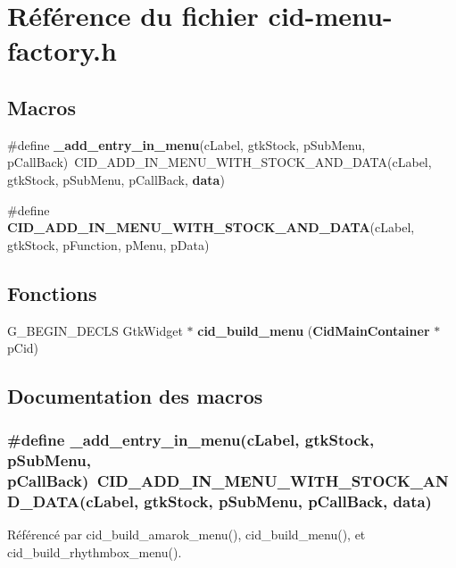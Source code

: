 \section{Référence du fichier cid-menu-factory.h}
\label{cid-menu-factory_8h}
\subsection*{Macros}
\begin{CompactItemize}
\item 
\#define {\bf \_\-add\_\-entry\_\-in\_\-menu}(cLabel, gtkStock, pSubMenu, pCallBack)~CID\_\-ADD\_\-IN\_\-MENU\_\-WITH\_\-STOCK\_\-AND\_\-DATA(cLabel, gtkStock, pSubMenu, pCallBack, {\bf data})
\item 
\#define {\bf CID\_\-ADD\_\-IN\_\-MENU\_\-WITH\_\-STOCK\_\-AND\_\-DATA}(cLabel, gtkStock, pFunction, pMenu, pData)
\end{CompactItemize}
\subsection*{Fonctions}
\begin{CompactItemize}
\item 
G\_\-BEGIN\_\-DECLS GtkWidget $\ast$ {\bf cid\_\-build\_\-menu} ({\bf CidMainContainer} $\ast$pCid)
\end{CompactItemize}


\subsection{Documentation des macros}
\subsubsection{\setlength{\rightskip}{0pt plus 5cm}\#define \_\-add\_\-entry\_\-in\_\-menu(cLabel, \/  gtkStock, \/  pSubMenu, \/  pCallBack)~CID\_\-ADD\_\-IN\_\-MENU\_\-WITH\_\-STOCK\_\-AND\_\-DATA(cLabel, gtkStock, pSubMenu, pCallBack, {\bf data})}\label{cid-menu-factory_8h_1afa152e07595006ac48a3da7a0ecf58}




Référencé par cid\_\-build\_\-amarok\_\-menu(), cid\_\-build\_\-menu(), et cid\_\-build\_\-rhythmbox\_\-menu().
